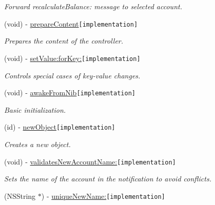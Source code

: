 \begin{CompactItemize}
\begin{CompactList}\small\item\em Forward recalculateBalance: message to selected account. \item\end{CompactList}\item 
(void) - \hyperlink{interface_z_x_account_controller_b1403533592d33b6fc3a43c7153c27b4}{prepareContent}{\tt  \mbox{[}implementation\mbox{]}}
\begin{CompactList}\small\item\em Prepares the content of the controller. \item\end{CompactList}\item 
(void) - \hyperlink{interface_z_x_account_controller_275e5ff12dad8038bf3ed96a19aac65e}{setValue:forKey:}{\tt  \mbox{[}implementation\mbox{]}}
\begin{CompactList}\small\item\em Controls special cases of key-value changes. \item\end{CompactList}\item 
(void) - \hyperlink{interface_z_x_account_controller_9bde4a1f4ab0fdc0b18a190f4573977a}{awakeFromNib}{\tt  \mbox{[}implementation\mbox{]}}
\begin{CompactList}\small\item\em Basic initialization. \item\end{CompactList}\item 
(id) - \hyperlink{interface_z_x_account_controller_7c2d8697d2ed15c4fbc55d670564e751}{newObject}{\tt  \mbox{[}implementation\mbox{]}}
\begin{CompactList}\small\item\em Creates a new object. \item\end{CompactList}\item 
(void) - \hyperlink{interface_z_x_account_controller_765323e412d28612c9737af99becf5c8}{validatesNewAccountName:}{\tt  \mbox{[}implementation\mbox{]}}
\begin{CompactList}\small\item\em Sets the name of the account in the notification to avoid conflicts. \item\end{CompactList}\item 
(NSString $\ast$) - \hyperlink{interface_z_x_account_controller_0efcea0525fa3f4d189fd52592fab996}{uniqueNewName:}{\tt  \mbox{[}implementation\mbox{]}}

\end{CompactItemize}
